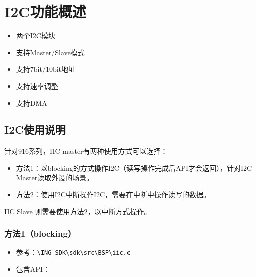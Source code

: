 \documentclass[
  12pt,
]{book}
\providecommand{\tightlist}{%
  \setlength{\itemsep}{0pt}\setlength{\parskip}{0pt}}
\begin{document}
\hypertarget{i2cux529fux80fdux6982ux8ff0}{%
\chapter{I2C功能概述}\label{i2cux529fux80fdux6982ux8ff0}}

\begin{itemize}
\tightlist
\item
  两个I2C模块
\item
  支持Master/Slave模式
\item
  支持7bit/10bit地址
\item
  支持速率调整
\item
  支持DMA
\end{itemize}

\hypertarget{i2cux4f7fux7528ux8bf4ux660e}{%
\section{I2C使用说明}\label{i2cux4f7fux7528ux8bf4ux660e}}

针对916系列，IIC master有两种使用方式可以选择：

\begin{itemize}
\item
  方法1：以blocking的方式操作I2C（读写操作完成后API才会返回），针对I2C Master读取外设的场景。
\item
  方法2：使用I2C中断操作I2C，需要在中断中操作读写的数据。
\end{itemize}

IIC Slave 则需要使用方法2，以中断方式操作。

\hypertarget{ux65b9ux6cd51blocking}{%
\subsection{方法1（blocking）}\label{ux65b9ux6cd51blocking}}

\begin{itemize}
\item
  参考：\texttt{\textbackslash{}ING\_SDK\textbackslash{}sdk\textbackslash{}src\textbackslash{}BSP\textbackslash{}iic.c}
\item
  包含API：
\end{itemize}
\end{document}
